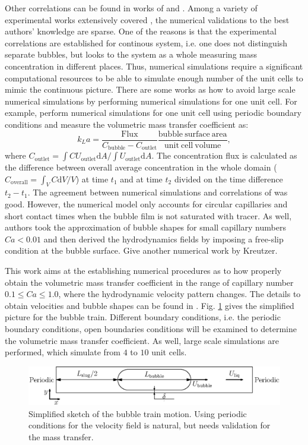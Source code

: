 \documentclass{article}
\newcommand{\uoutlet}{U_{\mathrm{outlet}}}
\newcommand{\cbubble}{C_{\mathrm{bubble}}}
\newcommand{\coutlet}{C_{\mathrm{outlet}}}
\newcommand{\coverall}{C_{\mathrm{overall}}}
\begin{document}
Other correlations can be found in works of \citet{kreutzer-overview}
and \citet{bercic-mass}. Among a variety of experimental works extensively covered
\cite{yue-mass}, the numerical validations to the best authors' knowledge are sparse. One of the
reasons is that the experimental correlations are established for continous system, i.e. one does
not distinguish separate bubbles, but looks to the system as a whole measuring mass concentration
in different places. Thus, numerical simulations require a significant computational
resources to be able to simulate enough number of the unit cells to mimic the continuous picture.
There are some works as how to avoid large scale numerical simulations by performing numerical
simulations for one unit cell. For example, \citet{vanbaten-circular} perform numerical
simulations for one unit cell using periodic boundary conditions and measure the volumetric mass
transfer coefficient as:
\begin{equation}
\label{main:simulation:equation}
k_L a=\frac{\mathrm{Flux}}{\cbubble-\coutlet} \frac{\mathrm{bubble\ surface\ area}}{\mathrm{unit\
cell\ volume}},
\end{equation}
where $\coutlet=\int{C \uoutlet \mathrm{d}A}/\int{\uoutlet\mathrm{d}A}$. 
The concentration flux is calculated as the difference between overall
average concentration in the whole domain ($\coverall=\int_{V} C \mathrm{d}V /V$)
at time
$t_1$ and at time $t_2$ divided on the time difference $t_2-t_1$. The agreement between numerical
simulations and correlations of \citet{bercic-mass} was good. However, the numerical model only
accounts for circular capillaries and short contact times when the
bubble film is not saturated with tracer. As well, authors took the
approximation of bubble shapes for small capillary numbers $Ca<0.01$ and then derived the
hydrodynamics fields by imposing a free-slip condition at the bubble surface. {\color{red} Give
another numerical work by Kreutzer.} 

This work aims at the establishing numerical procedures as to how properly obtain the volumetric
mass transfer coefficient in the range of capillary number $0.1\leq Ca\leq 1.0$, where the
hydrodynamic velocity pattern changes. The details to obtain velocities and bubble shapes can be
found in \cite{kuzmin-binary2d}. Fig. \ref{fig:benchmark:hydro} gives the simplified picture for the
bubble train. Different boundary conditions, i.e. the periodic boundary
conditions, open boundaries conditions will be examined to determine the volumetric mass transfer
coefficient. As well, large scale simulations are performed, which simulate from $4$ to $10$ unit
cells.
\begin{figure}[htb!]
\includegraphics[width=\textwidth]{Figures/benchmark_hydro.eps}
\caption{Simplified sketch of the bubble train motion. Using periodic conditions for the velocity
field is natural, but needs validation for the mass transfer. \label{fig:benchmark:hydro}}
\end{figure}
\end{document}

